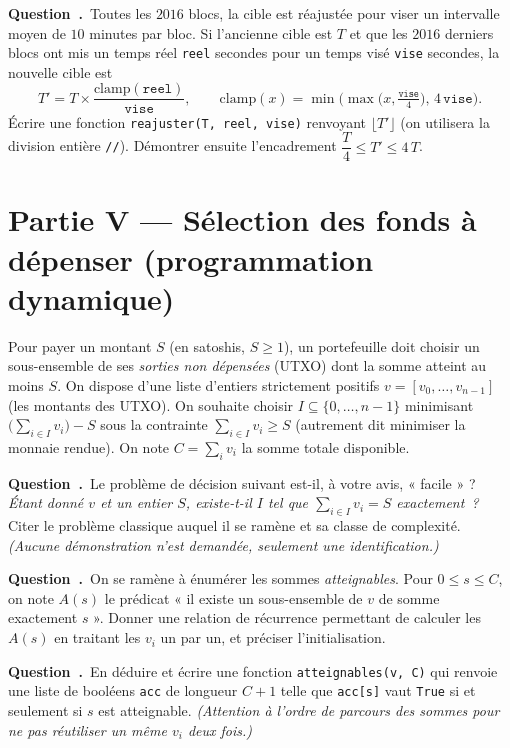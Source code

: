 \documentclass[11pt,a4paper]{article}
\newcounter{qcnt}
\newcommand{\Q}{\medskip\par\stepcounter{qcnt}\noindent\textbf{Question~\theqcnt.}~}
\newcommand{\code}[1]{\lstinline!#1!}
\begin{document}
\Q Toutes les $2016$ blocs, la cible est réajustée pour viser un intervalle moyen de $10$ minutes par bloc. Si l'ancienne cible est $T$ et que les $2016$ derniers blocs ont mis un temps réel \code{reel} secondes pour un temps visé \code{vise} secondes, la nouvelle cible est
\[
  T' = T \times \frac{\mathrm{clamp}(\texttt{reel})}{\texttt{vise}},
  \qquad
  \mathrm{clamp}(x) = \min\!\Big(\max\big(x,\tfrac{\texttt{vise}}{4}\big),\, 4\,\texttt{vise}\Big).
\]
Écrire une fonction \code{reajuster(T, reel, vise)} renvoyant $\lfloor T'\rfloor$ (on utilisera la division entière \code{//}). Démontrer ensuite l'encadrement $\dfrac{T}{4} \le T' \le 4\,T$.

\section*{Partie V --- Sélection des fonds à dépenser (programmation dynamique)}

Pour payer un montant $S$ (en satoshis, $S\ge 1$), un portefeuille doit choisir un sous-ensemble de ses \emph{sorties non dépensées} (UTXO) dont la somme atteint au moins $S$. On dispose d'une liste d'entiers strictement positifs $v = [v_0, \ldots, v_{n-1}]$ (les montants des UTXO). On souhaite choisir $I\subseteq\{0,\ldots,n-1\}$ minimisant $\big(\sum_{i\in I} v_i\big) - S$ sous la contrainte $\sum_{i\in I} v_i \ge S$ (autrement dit minimiser la monnaie rendue). On note $C = \sum_{i} v_i$ la somme totale disponible.

\Q Le problème de décision suivant est-il, à votre avis, « facile » ? \emph{Étant donné $v$ et un entier $S$, existe-t-il $I$ tel que $\sum_{i\in I} v_i = S$ exactement~?} Citer le problème classique auquel il se ramène et sa classe de complexité. \emph{(Aucune démonstration n'est demandée, seulement une identification.)}

\Q On se ramène à énumérer les sommes \emph{atteignables}. Pour $0\le s\le C$, on note $A(s)$ le prédicat « il existe un sous-ensemble de $v$ de somme exactement $s$ ». Donner une relation de récurrence permettant de calculer les $A(s)$ en traitant les $v_i$ un par un, et préciser l'initialisation.

\Q En déduire et écrire une fonction \code{atteignables(v, C)} qui renvoie une liste de booléens \code{acc} de longueur $C+1$ telle que \code{acc[s]} vaut \code{True} si et seulement si $s$ est atteignable. \emph{(Attention à l'ordre de parcours des sommes pour ne pas réutiliser un même $v_i$ deux fois.)}
\end{document}
